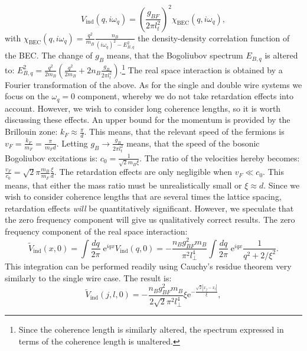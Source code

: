 \begin{equation}
V_{\text{ind}}(q, i\omega_q) = \left(\frac{g_{BF}}{2\pi l_t^2}\right)^2 \chi_\text{BEC}(q, i\omega_q), 
\label{eq.VFFmomentumspace.kitaevchain}
\end{equation}
with $\chi_\text{BEC}(q, i\omega_q) = \frac{q^2}{m_B}\frac{n_B}{(i\omega_q)^2 - E_{B,q}^2}$ the density-density correlation function of the BEC. The change of $g_B$ means, that the Bogoliubov spectrum $E_{B,q}$ is altered to: $E_{B,q}^2 = \frac{q^2}{2m_B}\left(\frac{q^2}{2m_B} + 2n_B\frac{g_B}{2\pi l_t^2}\right)$.\footnote{Since the coherence length is similarly altered, the spectrum expressed in terms of the coherence length is unaltered.} The real space interaction is obtained by a Fourier transformation of the above. As for the single and double wire systems we focus on the $\omega_q = 0$ component, whereby we do not take retardation effects into account. However, we wish to consider long coherence lengths, so it is worth discussing these effects. An upper bound for the momentum is provided by the Brillouin zone: $k_F \approx \frac{\pi}{d}$. This means, that the relevant speed of the fermions is $v_F = \frac{k_F}{m_F} = \frac{\pi}{m_Fd}$. Letting $g_B \to \frac{g_B}{2\pi l_t^2}$ means, that the speed of the bosonic Bogoliubov excitations is: $c_0 = \frac{1}{\sqrt{2}m_B\xi}$. The ratio of the velocities hereby becomes: $\frac{v_F}{c_0} = \sqrt{2}\pi\frac{m_B}{m_F}\frac{\xi}{d}$. The retardation effects are only negligible when $v_F\ll c_0$. This means, that either the mass ratio must be unrealistically small or $\xi \approx d$. Since we wish to consider coherence lengths that are several times the lattice spacing, retardation effects \textit{will} be quantitatively significant. However, we speculate that the zero frequency component will give us qualitatively correct results. The zero frequency component of the real space interaction:
\begin{equation}
\tilde{V}_{\text{ind}}(x, 0) = \int \frac{dq}{2\pi} \; \text{e}^{iqx}V_{\text{ind}}(q, 0) = -\frac{n_Bg_{BF}^2m_B}{\pi^2l_{\perp}^4}\int \frac{dq}{2\pi} \; \text{e}^{iqx} \frac{1}{q^2 + 2/\xi^2}. \nonumber
\end{equation}
This integration can be performed readily using Cauchy's residue theorem very similarly to the single wire case. The result is:
\begin{equation}
\tilde{V}_{\text{ind}}(j, l, 0) = -\frac{n_Bg_{BF}^2m_B}{2\sqrt{2}\pi^2l_{\perp}^4}\xi \text{e}^{-\frac{\sqrt{2}|x_j - x_l|}{\xi}},
\label{eq.Inducedcinteractionrealspace.kitaevchain}
\end{equation}
